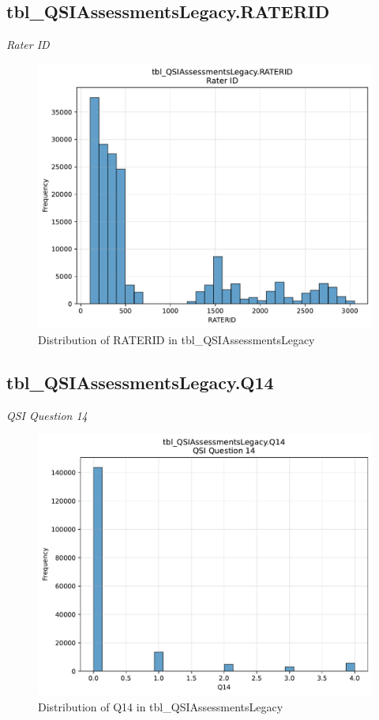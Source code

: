 \subsection{tbl\_QSIAssessmentsLegacy.RATERID}
\textit{Rater ID}

\begin{figure}[htbp]
\centering
\includegraphics[width=\textwidth]{figures/dbo_tbl_QSIAssessmentsLegacy_RATERID.pdf}
\caption{Distribution of RATERID in tbl\_QSIAssessmentsLegacy}
\end{figure}\newpage

\subsection{tbl\_QSIAssessmentsLegacy.Q14}
\textit{QSI Question 14}

\begin{figure}[htbp]
\centering
\includegraphics[width=\textwidth]{figures/dbo_tbl_QSIAssessmentsLegacy_Q14.pdf}
\caption{Distribution of Q14 in tbl\_QSIAssessmentsLegacy}
\end{figure}\newpage

